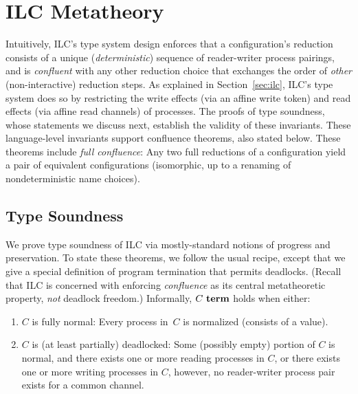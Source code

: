 \section{ILC Metatheory}
\label{sec:metatheory}


Intuitively, ILC's type system design enforces that a
configuration's reduction consists of a unique
(\emph{deterministic}) sequence of reader-writer process pairings,
and is \emph{confluent} with any other reduction choice that exchanges 
the order of \emph{other} (non-interactive) reduction steps.
%
As explained in Section~\ref{sec:ilc}, ILC's type system does so by restricting the
write effects (via an affine write token) and read effects (via affine read
channels) of processes.
%
The proofs of type soundness, whose statements we discuss next, 
establish the validity of these invariants.
%
These language-level invariants support confluence theorems, also
stated below.
%
These theorems include \emph{full confluence}:
Any two full reductions of a configuration yield a pair of equivalent configurations
(isomorphic, up to a renaming of nondeterministic name choices).
%

\subsection{Type Soundness}

We prove type soundness of ILC via mostly-standard notions of progress
and preservation.
%
To state these theorems, we follow the usual recipe, except that we give a
special definition of program termination that permits deadlocks. (Recall that
ILC is concerned with enforcing \emph{confluence} as its central metatheoretic
property, \emph{not} deadlock freedom.)
%
Informally, $C~\textbf{term}$ holds when either:
\begin{enumerate}[leftmargin=*]
 \item $C$ is fully normal: Every process in~$C$ is normalized (consists of a
   value).
 \item $C$ is (at least partially) deadlocked: Some (possibly empty) portion of
   $C$ is normal, and there exists one or more reading processes in $C$, or
   there exists one or more writing processes in $C$, however, no reader-writer
   process pair exists for a common channel.
\end{enumerate}

%

